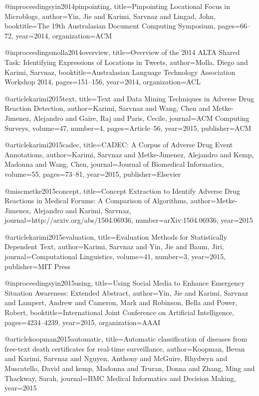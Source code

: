 @inproceedings{yin2014pinpointing,
  title={Pinpointing Locational Focus in Microblogs},
  author={Yin, Jie and Karimi, Sarvnaz and Lingad, John},
  booktitle={The 19th Australasian Document Computing Symposium},
  pages={66--72},
  year={2014},
  organization={ACM}
}

@inproceedings{molla2014overview,
  title={Overview of the 2014 ALTA Shared Task: Identifying Expressions of Locations in Tweets},
  author={Molla, Diego and Karimi, Sarvnaz},
  booktitle={Australasian Language Technology Association Workshop 2014},
  pages={151--156},
  year={2014},
  organization={ACL}
}

@article{karimi2015text,
  title={Text and Data Mining Techniques in Adverse Drug Reaction Detection},
  author={Karimi, Sarvnaz and Wang, Chen and Metke-Jimenez, Alejandro and Gaire, Raj and Paris, Cecile},
  journal={ACM Computing Surveys},
  volume={47},
  number={4},
  pages={Article--56},
  year={2015},
  publisher={ACM}
}

@article{karimi2015cadec,
  title={CADEC: A Corpus of Adverse Drug Event Annotations},
  author={Karimi, Sarvnaz and Metke-Jimenez, Alejandro and Kemp, Madonna and Wang, Chen},
  journal={Journal of Biomedical Informatics},
  volume={55},
  pages={73--81},
  year={2015},
  publisher={Elsevier}
}

@misc{metke2015concept,
  title={Concept Extraction to Identify Adverse Drug Reactions in Medical Forums:  A Comparison of Algorithms},
  author={Metke-Jimenez, Alejandro and Karimi, Sarvnaz},
  journal={http://arxiv.org/abs/1504.06936},
  number={arXiv:1504.06936},
  year={2015}
}

@article{karimi2015evaluation,
  title={Evaluation Methods for Statistically Dependent Text},
  author={Karimi, Sarvnaz and Yin, Jie and Baum, Jiri},
  journal={Computational Linguistics},
  volume={41},
  number={3},
  year={2015},
  publisher={MIT Press}
}

@inproceedings{yin2015using,
  title={Using Social Media to Enhance Emergency Situation Awareness: Extended Abstract},
  author={Yin, Jie and Karimi, Sarvnaz and Lampert, Andrew and Cameron, Mark and Robinson, Bella and Power, Robert},
  booktitle={International Joint Conference on Artificial Intelligence},
  pages={4234--4239},
  year={2015},
  organization={AAAI}
}

@article{koopman2015automatic,
  title={Automatic classification of diseases from free-text death certificates for real-time surveillance},
  author={Koopman, Bevan and Karimi, Sarvnaz and Nguyen, Anthony and McGuire, Rhydwyn and Muscatello, David and kemp, Madonna and Truran, Donna and Zhang, Ming and Thackway, Sarah},
  journal={BMC Medical Informatics and Decision Making},
  year={2015}
}

